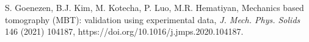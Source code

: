 \documentclass[11pt]{article}
\begin{document}
\begin{list}{}{%
  \setlength{\leftmargin}{2em}%
  \setlength{\itemindent}{-2em}%
  \setlength{\itemsep}{0.5em}%
  \setlength{\parsep}{0pt}%
}
\item [38] S. Goenezen, B.J. Kim, M. Kotecha, P. Luo, M.R.
Hematiyan, Mechanics based tomography (MBT): validation using
experimental data, \emph{J. Mech. Phys. Solids} 146 (2021)
104187, https://doi.org/10.1016/j.jmps.2020.104187.

\end{list}

\end{document}
